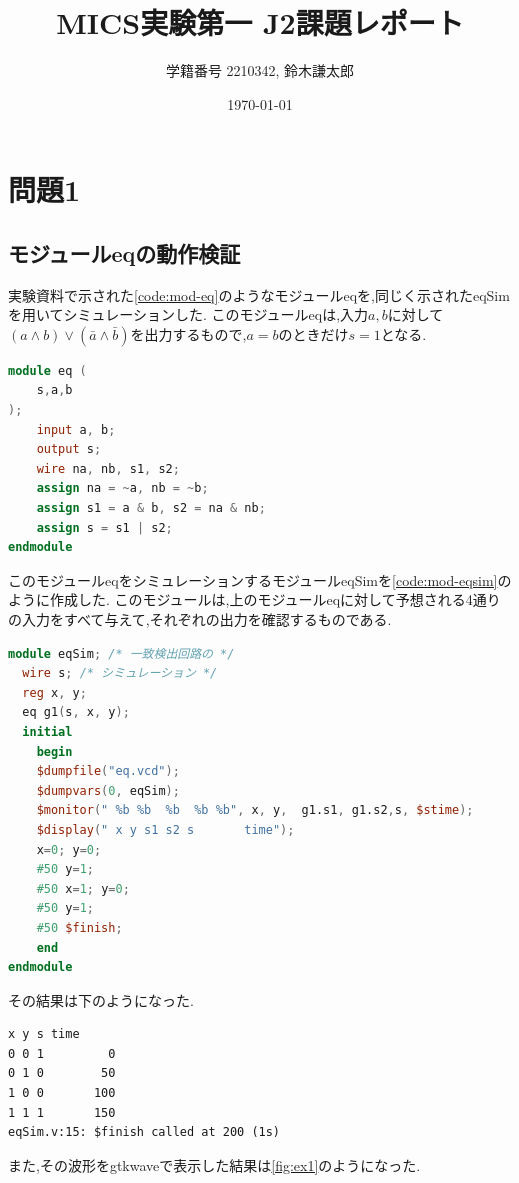 \documentclass[autodetect-engine, dvi=dvipdfmx, 10pt, a4paper, ja=standard]{bxjsarticle}
\title{MICS実験第一 J2課題レポート}
\author{学籍番号 2210342, 鈴木謙太郎}
\date{\today}
\begin{document}
\maketitle


\section{問題1}
\label{sec:ex-1}

\subsection{モジュールeqの動作検証}

実験資料で示された\ref{code:mod-eq}のようなモジュールeqを,同じく示されたeqSimを用いてシミュレーションした.
このモジュールeqは,入力$a,b$に対して$(a \land b) \lor (\bar{a} \land \bar{b})$を出力するもので,$a = b$のときだけ$s = 1$となる.


\begin{lstlisting}[language={Verilog}, caption={モジュールeqのVerilogコード}, label={code:mod-eq}]
module eq (
    s,a,b
);
    input a, b;
    output s;
    wire na, nb, s1, s2;
    assign na = ~a, nb = ~b;
    assign s1 = a & b, s2 = na & nb;
    assign s = s1 | s2;
endmodule
\end{lstlisting}

このモジュールeqをシミュレーションするモジュールeqSimを\ref{code:mod-eqsim}のように作成した.
このモジュールは,上のモジュールeqに対して予想される4通りの入力をすべて与えて,それぞれの出力を確認するものである.


\begin{lstlisting}[language={Verilog}, caption={モジュールeqSimのVerilogコード}, label={code:mod-eqsim}]
module eqSim; /* 一致検出回路の */
  wire s; /* シミュレーション */
  reg x, y;
  eq g1(s, x, y);
  initial
    begin
    $dumpfile("eq.vcd");
    $dumpvars(0, eqSim);
    $monitor(" %b %b  %b  %b %b", x, y,  g1.s1, g1.s2,s, $stime);
    $display(" x y s1 s2 s       time");
    x=0; y=0;
    #50 y=1;
    #50 x=1; y=0;
    #50 y=1;
    #50 $finish;
    end
endmodule
\end{lstlisting}

その結果は下のようになった.

\begin{verbatim}
x y s time
0 0 1         0
0 1 0        50
1 0 0       100
1 1 1       150
eqSim.v:15: $finish called at 200 (1s)
\end{verbatim}


また,その波形をgtkwaveで表示した結果は\ref{fig:ex1}のようになった.
\end{document}
